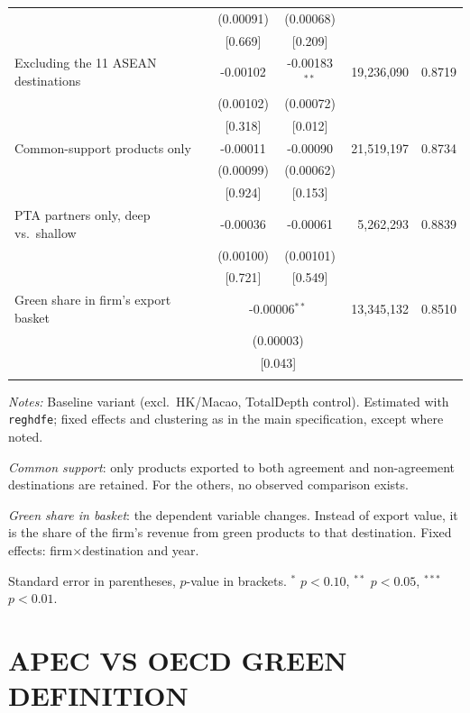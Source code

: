 \documentclass{article}
\begin{document}
\begin{table}[htbp]
\begin{threeparttable}
\begin{tabular}{lccrc}
 & (0.00091) & (0.00068) & & \\
 & [0.669] & [0.209] & & \\
\addlinespace
Excluding the 11 ASEAN destinations & -0.00102 & -0.00183$^{**}$ & 19,236,090 & 0.8719 \\
 & (0.00102) & (0.00072) & & \\
 & [0.318] & [0.012] & & \\
\addlinespace
Common-support products only & -0.00011 & -0.00090 & 21,519,197 & 0.8734 \\
 & (0.00099) & (0.00062) & & \\
 & [0.924] & [0.153] & & \\
\addlinespace
PTA partners only, deep vs.\ shallow & -0.00036 & -0.00061 & 5,262,293 & 0.8839 \\
 & (0.00100) & (0.00101) & & \\
 & [0.721] & [0.549] & & \\
\addlinespace
Green share in firm's export basket & \multicolumn{2}{c}{-0.00006$^{**}$} & 13,345,132 & 0.8510 \\
 & \multicolumn{2}{c}{(0.00003)} & & \\
 & \multicolumn{2}{c}{[0.043]} & & \\
\addlinespace
\bottomrule
\end{tabular}
\begin{tablenotes}[flushleft]\footnotesize
\item \emph{Notes:} Baseline variant (excl.\ HK/Macao, TotalDepth control). Estimated with \texttt{reghdfe}; fixed effects and clustering as in the main specification, except where noted.
\item \textit{Common support}: only products exported to both agreement and non-agreement destinations are retained. For the others, no observed comparison exists.
\item \textit{Green share in basket}: the dependent variable changes. Instead of export value, it is the share of the firm's revenue from green products to that destination. Fixed effects: firm$\times$destination and year.
\item Standard error in parentheses, $p$-value in brackets. $^{*}$ $p<0.10$, $^{**}$ $p<0.05$, $^{***}$ $p<0.01$.
\end{tablenotes}
\end{threeparttable}
\end{table}


\newpage
\section{APEC VS OECD GREEN DEFINITION}
\end{document}
